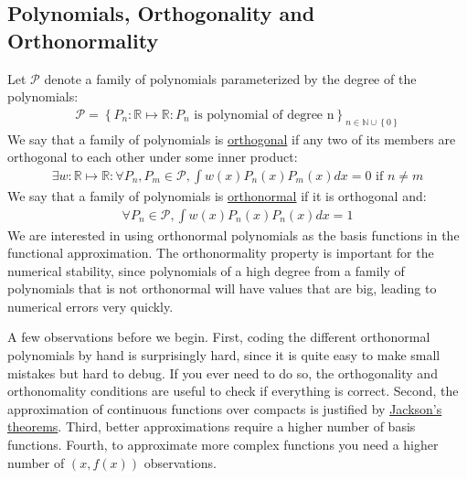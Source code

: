 \documentclass[12pt, a4paper]{article}
\newcommand{\Set}[1]{\left\{#1\right\}}
\begin{document}
\subsection{Polynomials, Orthogonality and Orthonormality}
\label{sec:orgbb0435b}
Let \(\mathcal{P}\) denote a family of polynomials parameterized by the degree of the polynomials:
\begin{align*}
\mathcal{P}=\Set{P_n:\mathbb{R}\mapsto\mathbb{R}: P_n\text { is polynomial of degree n}}_{n \in\mathbb{N}\cup\Set{0}}
\end{align*}
We say that a family of polynomials is \uline{orthogonal} if any two of its members are orthogonal to each other under some inner product:
\begin{align*}
\exists w:\mathbb{R}\mapsto\mathbb{R}:\forall P_n, P_m\in\mathcal{P}, \int w(x)P_n(x) P_m(x)dx = 0 \text{ if } n\neq m
\end{align*}
We say that a family of polynomials is \uline{orthonormal} if it is orthogonal and:
\begin{align*}
\forall P_n\in\mathcal{P},\int w(x)P_n(x)P_n(x)dx = 1
\end{align*}
We are interested in using orthonormal polynomials as the basis functions in the functional approximation.
The orthonormality property is important for the numerical stability, since polynomials of a high degree from a family of polynomials that is not orthonormal will have values that are big, leading to numerical errors very quickly.

A few observations before we begin.
First, coding the different orthonormal polynomials by hand is surprisingly hard, since it is quite easy to make small mistakes but hard to debug.
If you ever need to do so, the orthogonality and orthonomality conditions are useful to check if everything is correct.
Second, the approximation of continuous functions over compacts is justified by \href{https://en.wikipedia.org/wiki/Jackson\%27s\_inequality}{Jackson's theorems}.
Third, better approximations require a higher number of basis functions.
Fourth, to approximate more complex functions you need a higher number of \((x, f(x))\) observations.
\end{document}
